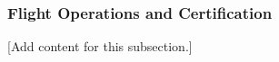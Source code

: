
\subsubsection{Flight Operations and Certification}
\label{subsubsec:design_7_3_flight_operations_certification}

[Add content for this subsection.]
